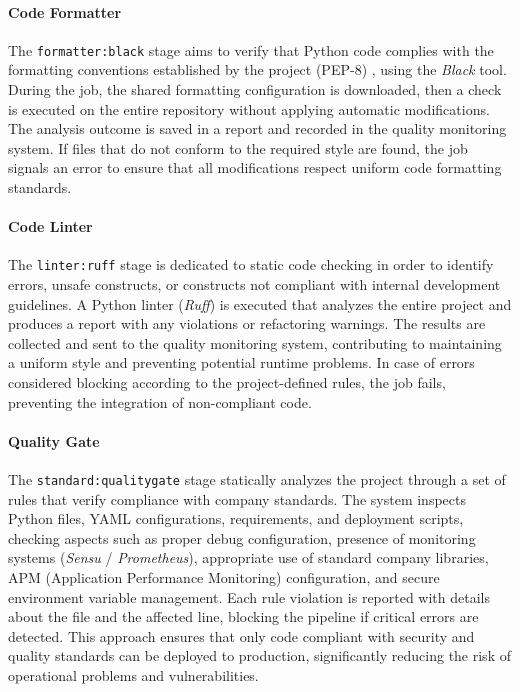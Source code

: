 \paragraph{Code Formatter}
The \texttt{formatter:black} stage aims to verify that Python code complies with the formatting conventions established by the project (PEP-8) \cite{pep8}, using the \textit{Black} tool. During the job, the shared formatting configuration is downloaded, then a check is executed on the entire repository without applying automatic modifications. The analysis outcome is saved in a report and recorded in the quality monitoring system. If files that do not conform to the required style are found, the job signals an error to ensure that all modifications respect uniform code formatting standards.

\paragraph{Code Linter}
The \texttt{linter:ruff} stage is dedicated to static code checking in order to identify errors, unsafe constructs, or constructs not compliant with internal development guidelines. A Python linter (\textit{Ruff}) is executed that analyzes the entire project and produces a report with any violations or refactoring warnings. The results are collected and sent to the quality monitoring system, contributing to maintaining a uniform style and preventing potential runtime problems. In case of errors considered blocking according to the project-defined rules, the job fails, preventing the integration of non-compliant code.

\paragraph{Quality Gate}
The \texttt{standard:qualitygate} stage statically analyzes the project through a set of rules that verify compliance with company standards. The system inspects Python files, YAML configurations, requirements, and deployment scripts, checking aspects such as proper debug configuration, presence of monitoring systems (\textit{Sensu} / \textit{Prometheus}), appropriate use of standard company libraries, APM (Application Performance Monitoring) configuration, and secure environment variable management. Each rule violation is reported with details about the file and the affected line, blocking the pipeline if critical errors are detected. This approach ensures that only code compliant with security and quality standards can be deployed to production, significantly reducing the risk of operational problems and vulnerabilities.

